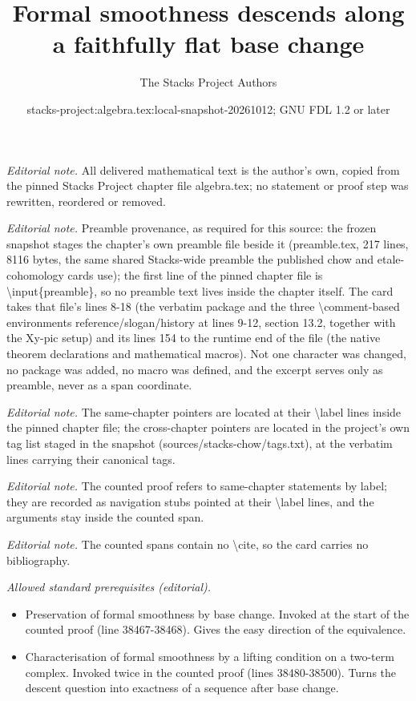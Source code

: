 \documentclass[10pt,a4paper]{amsart}
\title{Formal smoothness descends along a faithfully flat base change}
\author{The Stacks Project Authors}
\date{stacks-project:algebra.tex:local-snapshot-20261012; GNU FDL 1.2 or later}
\theoremstyle{plain}
\theoremstyle{definition}
\theoremstyle{remark}
\numberwithin{equation}{subsection}
\begin{document}
\maketitle
\noindent\textit{Editorial note.} All delivered mathematical text is the author's own, copied from the pinned Stacks Project chapter file algebra.tex; no statement or proof step was rewritten, reordered or removed.\par\medskip
\noindent\textit{Editorial note.} Preamble provenance, as required for this source: the frozen snapshot stages the chapter's own preamble file beside it (preamble.tex, 217 lines, 8116 bytes, the same shared Stacks-wide preamble the published chow and etale-cohomology cards use); the first line of the pinned chapter file is \textbackslash{}input\{preamble\}, so no preamble text lives inside the chapter itself. The card takes that file's lines 8-18 (the verbatim package and the three \textbackslash{}comment-based environments reference/slogan/history at lines 9-12, section 13.2, together with the Xy-pic setup) and its lines 154 to the runtime end of the file (the native theorem declarations and mathematical macros). Not one character was changed, no package was added, no macro was defined, and the excerpt serves only as preamble, never as a span coordinate.\par\medskip
\noindent\textit{Editorial note.} The same-chapter pointers are located at their \textbackslash{}label lines inside the pinned chapter file; the cross-chapter pointers are located in the project's own tag list staged in the snapshot (sources/stacks-chow/tags.txt), at the verbatim lines carrying their canonical tags.\par\medskip
\noindent\textit{Editorial note.} The counted proof refers to same-chapter statements by label; they are recorded as navigation stubs pointed at their \textbackslash{}label lines, and the arguments stay inside the counted span.\par\medskip
\noindent\textit{Editorial note.} The counted spans contain no \textbackslash{}cite, so the card carries no bibliography.\par\medskip
\noindent\textit{Allowed standard prerequisites (editorial).}\begin{itemize}
\item Preservation of formal smoothness by base change. Invoked at the start of the counted proof (line 38467-38468). Gives the easy direction of the equivalence.
\item Characterisation of formal smoothness by a lifting condition on a two-term complex. Invoked twice in the counted proof (lines 38480-38500). Turns the descent question into exactness of a sequence after base change.
\end{itemize}\medskip
\end{document}
